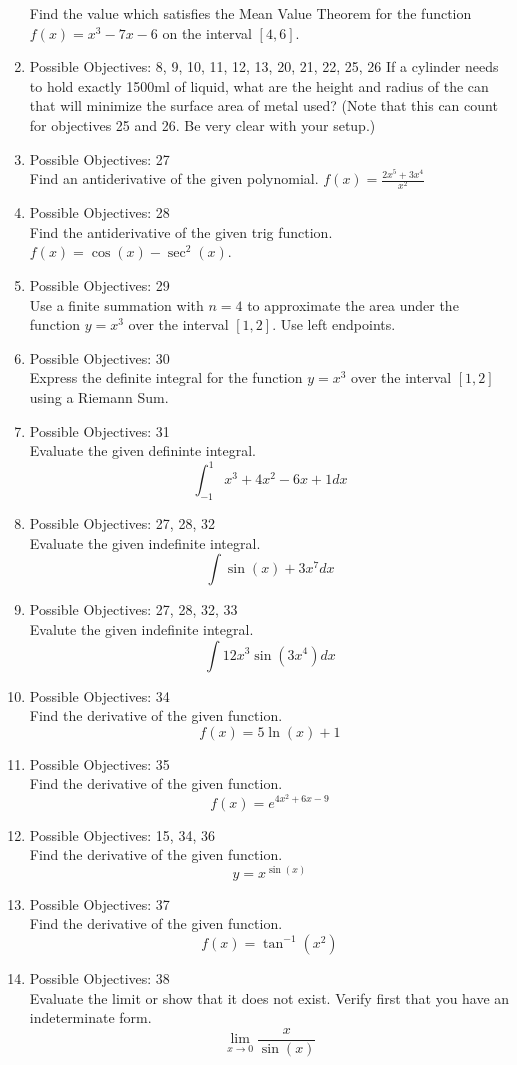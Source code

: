 \documentclass{exam}
\begin{document}
\begin{enumerate}
Find the value which satisfies the Mean Value Theorem for the function $f(x) = x^3 - 7x -6$ on the interval $[4,6]$.
\item Possible Objectives: 8, 9, 10, 11, 12, 13, 20, 21, 22, 25, 26
If a cylinder needs to hold exactly 1500ml of liquid, what are the height and radius of the can that will minimize the surface area of metal used? (Note that this can count for objectives 25 and 26. Be very clear with your setup.)
\item Possible Objectives: 27\\
Find an antiderivative of the given polynomial.
$f(x) = \frac{2x^5 + 3x^4}{x^2}$
\item Possible Objectives: 28\\
Find the antiderivative of the given trig function.
$f(x) = \cos(x) - \sec^2(x)$.
\item Possible Objectives: 29\\
Use a finite summation with $n=4$ to approximate the area under the function $y = x^3$ over the interval $[1,2]$. Use left endpoints.
\item Possible Objectives: 30\\
Express the definite integral for the function $y = x^3$ over the interval $[1,2]$ using a Riemann Sum.
\item Possible Objectives: 31\\
Evaluate the given defininte integral.
$$\int_{-1}^1 x^3 + 4x^2 - 6x + 1 dx$$
\item Possible Objectives: 27, 28, 32\\
Evaluate the given indefinite integral.
$$\int \sin(x) + 3x^7 dx$$
\item Possible Objectives: 27, 28, 32, 33\\
Evalute the given indefinite integral.
$$\int 12x^3\sin(3x^4) dx$$
\item Possible Objectives: 34\\
Find the derivative of the given function.
$$f(x) = 5\ln(x) + 1$$
\item Possible Objectives: 35\\
Find the derivative of the given function.
$$f(x) = e^{4x^2 + 6x - 9}$$
\item Possible Objectives: 15, 34, 36\\
Find the derivative of the given function.
$$y =x^{\sin(x)}$$
\item Possible Objectives: 37\\
Find the derivative of the given function.
$$f(x) = \tan^{-1}(x^2)$$
\item Possible Objectives: 38\\
Evaluate the limit or show that it does not exist. Verify first that you have an indeterminate form. $$\lim_{x\rightarrow 0} \frac{x}{\sin(x)}$$
\end{enumerate}
\end{document}
